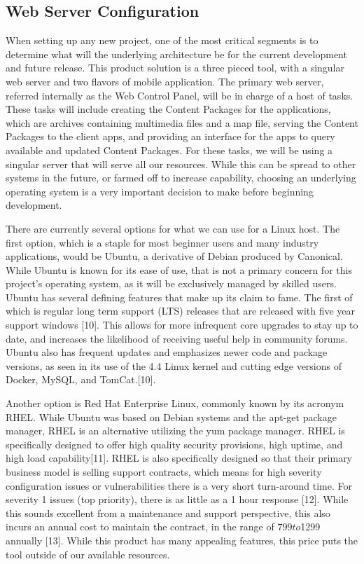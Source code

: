 \documentclass[letterpaper, 10pt,titlepage]{article}
\begin{document}
\subsection{Web Server Configuration}
When setting up any new project, one of the most critical segments is to determine what will the underlying architecture be for the current development and future release. This product solution is a three pieced tool, with a singular web server and two flavors of mobile application. The primary web server, referred internally as the Web Control Panel, will be in charge of a host of tasks. These tasks will include creating the Content Packages for the applications, which are archives containing multimedia files and a map file, serving the Content Packages to the client apps, and providing an interface for the apps to query available and updated Content Packages. For these tasks, we will be using a singular server that will serve all our resources. While this can be spread to other systems in the future, or farmed off to increase capability, choosing an underlying operating system is a very important decision to make before beginning development.


There are currently several options for what we can use for a Linux host. The first option, which is a staple for most beginner users and many industry applications, would be Ubuntu, a derivative of Debian produced by Canonical. While Ubuntu is known for its ease of use, that is not a primary concern for this project’s operating system, as it will be exclusively managed by skilled users. Ubuntu has several defining features that make up its claim to fame. The first of which is regular long term support (LTS) releases that are released with five year support windows [10]. This allows for more infrequent core upgrades to stay up to date, and increases the likelihood of receiving useful help in community forums. Ubuntu also has frequent updates and emphasizes newer code and package versions, as seen in its use of the 4.4 Linux kernel and  cutting edge versions of Docker, MySQL, and TomCat.[10]. 


Another option is Red Hat Enterprise Linux, commonly known by its acronym RHEL. While Ubuntu was based on Debian systems and the apt-get package manager, RHEL is an alternative utilizing the yum package manager. RHEL is specifically designed to offer high quality security provisions, high uptime, and high load capability[11]. RHEL is also specifically designed so that their primary business model is selling support contracts, which means for high severity configuration issues or vulnerabilities there is a very short turn-around time. For severity 1 issues (top priority), there is as little as a 1 hour response [12]. While this sounds excellent from a maintenance and support perspective, this also incurs an annual cost to maintain the contract, in the range of $799 to $1299 annually [13]. While this product has many appealing features, this price puts the tool outside of our available resources.
\end{document}
